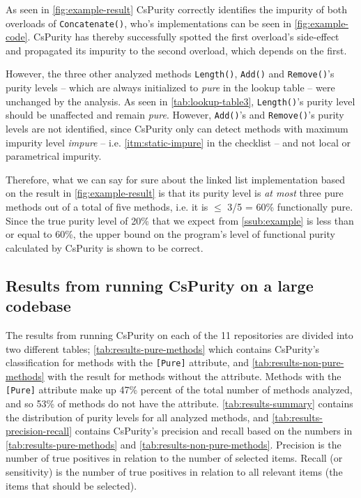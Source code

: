 \documentclass[a4paper,12pt]{article}
\begin{document}
As seen in \autoref{fig:example-result} CsPurity correctly identifies the impurity of both overloads of \texttt{Concatenate()}, who's implementations can be seen in \autoref{fig:example-code}. CsPurity has thereby successfully spotted the first overload's side-effect and propagated its impurity to the second overload, which depends on the first.

However, the three other analyzed methods \texttt{Length()}, \texttt{Add()} and \texttt{Remove()}'s purity levels -- which are always initialized to \textit{pure} in the lookup table -- were unchanged by the analysis. As seen in \autoref{tab:lookup-table3}, \texttt{Length()}'s purity level should be unaffected and remain \textit{pure}. However, \texttt{Add()}'s and \texttt{Remove()}'s purity levels are not identified, since CsPurity only can detect methods with maximum impurity level \textit{impure} -- i.e. \autoref{itm:static-impure} in the checklist -- and not local or parametrical impurity.

Therefore, what we can say for sure about the linked list implementation based on the result in \autoref{fig:example-result} is that its purity level is \textit{at most} three pure methods out of a total of five methods, i.e. it is $\leq$ 3/5 = 60\% functionally pure. Since the true purity level of 20\% that we expect from \autoref{ssub:example} is less than or equal to 60\%, the upper bound on the program's level of functional purity calculated by CsPurity is shown to be correct.


\subsection{Results from running CsPurity on a large codebase} \label{sub:results-larger-codebase}

The results from running CsPurity on each of the 11 repositories are divided into two different tables; \autoref{tab:results-pure-methods} which contains CsPurity's classification for methods with the \texttt{[Pure]} attribute, and \autoref{tab:results-non-pure-methods} with the result for methods without the attribute. Methods with the \texttt{[Pure]} attribute make up 47\% percent of the total number of methods analyzed, and so 53\% of methods do not have the attribute. \autoref{tab:results-summary} contains the distribution of purity levels for all analyzed methods, and \autoref{tab:results-precision-recall} contains CsPurity's precision and recall based on the numbers in \autoref{tab:results-pure-methods} and \autoref{tab:results-non-pure-methods}. Precision is the number of true positives in relation to the number of selected items. Recall (or sensitivity) is the number of true positives in relation to all relevant items (the items that should be selected).
\end{document}
